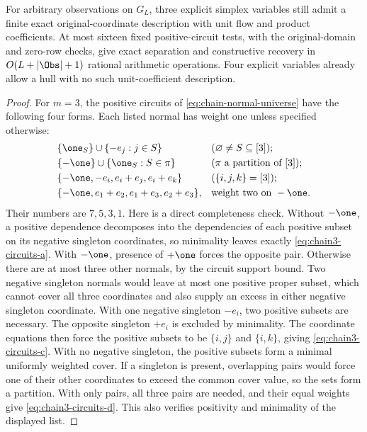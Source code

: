 \begin{theorem}\label{thm:three-state-chain}
For arbitrary observations on $G_L$, three explicit simplex variables
still admit a finite exact original-coordinate description with unit
flow and product coefficients. At most sixteen fixed positive-circuit tests,
with the original-domain and zero-row checks, give exact separation
and constructive recovery in $O(L+|\Obs|+1)$ rational arithmetic
operations. Four explicit variables already allow a hull with no
such unit-coefficient description.
\end{theorem}
\begin{proof}
For $m=3$, the positive circuits of \eqref{eq:chain-normal-universe}
have the following four forms. Each listed normal has weight one
unless specified otherwise:
\begin{align}
 &\{\one_S\}\cup\{-e_j:j\in S\}
       &&(\varnothing\ne S\subseteq[3]);\label{eq:chain3-circuits-a}\\
 &\{-\one\}\cup\{\one_S:S\in\pi\}
       &&(\pi\text{ a partition of }[3]);\label{eq:chain3-circuits-b}\\
 &\{-\one,-e_i,e_i+e_j,e_i+e_k\}
       &&(\{i,j,k\}=[3]);\label{eq:chain3-circuits-c}\\
 &\{-\one,e_1+e_2,e_1+e_3,e_2+e_3\},
       &&\text{weight two on }-\one.\label{eq:chain3-circuits-d}
\end{align}
Their numbers are $7,5,3,1$. Here is a direct completeness check.
Without $-\one$, a positive dependence decomposes into the
dependencies of each positive subset on its negative singleton
coordinates, so minimality leaves exactly
\eqref{eq:chain3-circuits-a}. With $-\one$, presence of $+\one$
forces the opposite pair. Otherwise there are at most three other
normals, by the circuit support bound. Two negative singleton
normals would leave at most one positive proper subset, which
cannot cover all three coordinates and also supply an excess in
either negative singleton coordinate. With one negative singleton
$-e_i$, two positive subsets are necessary. The opposite singleton
$+e_i$ is excluded by minimality. The coordinate equations then
force the positive subsets to be $\{i,j\}$ and $\{i,k\}$,
giving \eqref{eq:chain3-circuits-c}. With no negative singleton,
the positive subsets form a minimal uniformly weighted cover.
If a singleton is present, overlapping pairs would force one of
their other coordinates to exceed the common cover value, so the
sets form a partition. With only pairs, all three pairs are needed,
and their equal weights give \eqref{eq:chain3-circuits-d}.
This also verifies positivity and minimality of the displayed list.


\end{proof}
